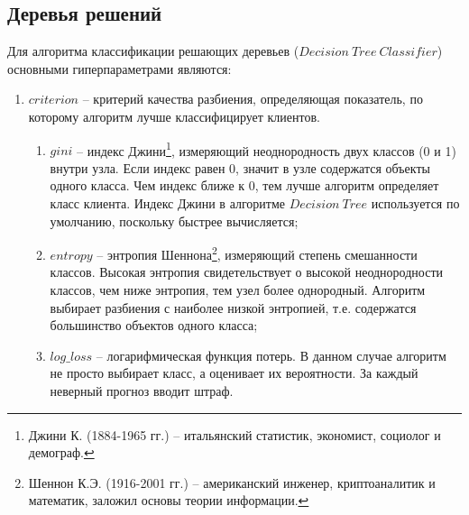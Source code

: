 \subsection{Деревья решений}

Для алгоритма классификации решающих деревьев ($Decision\ Tree\ Classifier$) основными гиперпараметрами являются:

\begin{enumerate}[nosep]
	\item $criterion$ -- критерий качества разбиения, определяющая показатель, по которому алгоритм лучше классифицирует клиентов. \begin{enumerate}
	\item [a)] $gini$ -- индекс Джини\footnote{Джини К. (1884-1965 гг.) -- итальянский статистик, экономист, социолог и демограф.}, измеряющий неоднородность двух классов (0 и 1) внутри узла. Если индекс равен 0, значит в узле содержатся объекты одного класса. Чем индекс ближе к 0, тем лучше алгоритм определяет класс клиента. Индекс Джини в алгоритме $Decision\ Tree$ используется по умолчанию, поскольку быстрее вычисляется;
	\item [b)] $entropy$ -- энтропия Шеннона\footnote{Шеннон К.Э. (1916-2001 гг.) -- американский инженер, криптоаналитик и математик, заложил основы теории информации.}, измеряющий степень смешанности классов. Высокая энтропия свидетельствует о высокой неоднородности классов, чем ниже энтропия, тем узел более однородный. Алгоритм выбирает разбиения с наиболее низкой энтропией, т.е. содержатся большинство объектов одного класса;
	\item [ с)] $log\_loss$ -- логарифмическая функция потерь. В данном случае алгоритм не просто выбирает класс, а оценивает их вероятности. За каждый неверный прогноз вводит штраф.
	\end{enumerate}

\end{enumerate}
